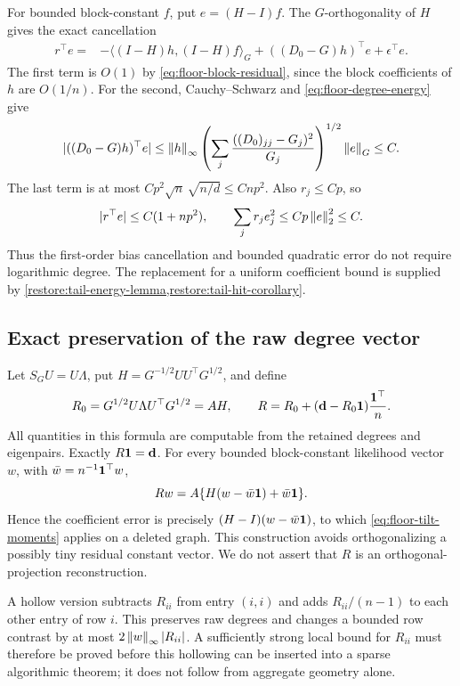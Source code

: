 For bounded block-constant $f$, put $e=(H-I)f$. The
$G$-orthogonality of $H$ gives the exact cancellation
\begin{align}
 r^\top e
 ={}&-\langle(I-H)h,(I-H)f\rangle_G
       +((D_0-G)h)^\top e+\epsilon^\top e.
       \label{eq:floor-tilted-cancellation}
\end{align}
The first term is $O(1)$ by \eqref{eq:floor-block-residual}, since
the block coefficients of $h$ are $O(1/n)$. For the second,
Cauchy--Schwarz and \eqref{eq:floor-degree-energy} give
\[
 |((D_0-G)h)^\top e|
 \le \left\lVert h\right\rVert_\infty
 \left(\sum_j\frac{((D_0)_{jj}-G_j)^2}{G_j}\right)^{1/2}
 \left\lVert e\right\rVert_G
 \le C.
\]
The last term is at most
$Cp^2\sqrt n\,\sqrt{n/d}\le Cnp^2$. Also $r_j\le Cp$, so
\begin{equation}\label{eq:floor-tilt-moments}
 |r^\top e|\le C(1+np^2),\qquad
 \sum_jr_je_j^2\le Cp\left\lVert e\right\rVert_2^2\le C.
\end{equation}
Thus the first-order bias cancellation and bounded quadratic error do
not require logarithmic degree. The replacement for a uniform
coefficient bound is supplied by
\cref{restore:tail-energy-lemma,restore:tail-hit-corollary}.

\subsection{Exact preservation of the raw degree vector}

Let $S_GU=U\Lambda$, put $H=G^{-1/2}UU^\top G^{1/2}$, and define
\begin{equation}\label{eq:floor-degree-corrected-action}
 R_0=G^{1/2}U\Lambda U^\top G^{1/2}=AH,\qquad
 R=R_0+(\mathbf d-R_0\mathbf 1)\frac{\mathbf 1^\top}{n}.
\end{equation}
All quantities in this formula are computable from the retained degrees
and eigenpairs. Exactly $R\mathbf 1=\mathbf d$. For every bounded
block-constant likelihood vector $w$, with $\bar w=n^{-1}\mathbf 1^\top w$,
\begin{equation}\label{eq:floor-effective-coefficients}
 Rw=A\{H(w-\bar w\mathbf 1)+\bar w\mathbf 1\}.
\end{equation}
Hence the coefficient error is precisely $(H-I)(w-\bar w\mathbf 1)$,
to which \eqref{eq:floor-tilt-moments} applies on a deleted graph.
This construction avoids orthogonalizing a possibly tiny residual
constant vector. We do not assert that $R$ is an orthogonal-projection
reconstruction.

A hollow version subtracts $R_{ii}$ from entry $(i,i)$ and adds
$R_{ii}/(n-1)$ to each other entry of row $i$. This preserves raw
degrees and changes a bounded row contrast by at most
$2\left\lVert w\right\rVert_\infty |R_{ii}|$. A sufficiently strong local bound for
$R_{ii}$ must therefore be proved before this hollowing can be inserted
into a sparse algorithmic theorem; it does not follow from aggregate
geometry alone.

